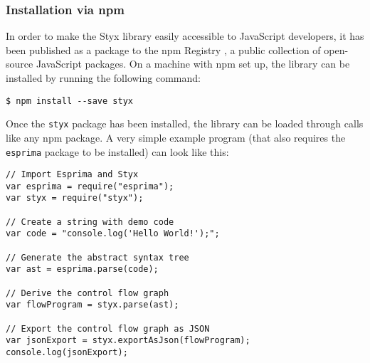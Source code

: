 \subsubsection{Installation via npm}

In order to make the Styx library easily accessible to JavaScript developers, it has been published as a package to the npm Registry \cite{npm}, a public collection of open-source JavaScript packages. On a machine with npm set up, the library can be installed by running the following command:

\begin{verbatim}
$ npm install --save styx
\end{verbatim}

Once the \texttt{styx} package has been installed, the library can be loaded through  calls like any npm package. A very simple example program (that also requires the \texttt{esprima} package to be installed) can look like this:

\begin{verbatim}
// Import Esprima and Styx
var esprima = require("esprima");
var styx = require("styx");

// Create a string with demo code
var code = "console.log('Hello World!');";

// Generate the abstract syntax tree
var ast = esprima.parse(code);

// Derive the control flow graph
var flowProgram = styx.parse(ast);

// Export the control flow graph as JSON
var jsonExport = styx.exportAsJson(flowProgram);
console.log(jsonExport);
\end{verbatim}
